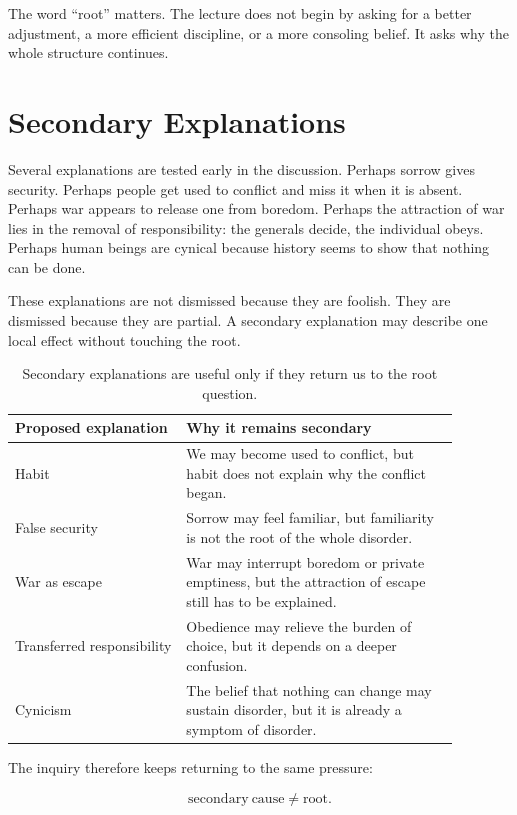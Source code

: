 The word ``root'' matters. The lecture does not begin by asking for a better adjustment, a more efficient discipline, or a more consoling belief. It asks why the whole structure continues.

\section{Secondary Explanations}

Several explanations are tested early in the discussion. Perhaps sorrow gives security. Perhaps people get used to conflict and miss it when it is absent. Perhaps war appears to release one from boredom. Perhaps the attraction of war lies in the removal of responsibility: the generals decide, the individual obeys. Perhaps human beings are cynical because history seems to show that nothing can be done.

These explanations are not dismissed because they are foolish. They are dismissed because they are partial. A secondary explanation may describe one local effect without touching the root.

\begin{table}
\centering
\begin{tabular}{p{0.34\linewidth}p{0.54\linewidth}}
\hline
\textbf{Proposed explanation} & \textbf{Why it remains secondary} \\
\hline
Habit & We may become used to conflict, but habit does not explain why the conflict began. \\
False security & Sorrow may feel familiar, but familiarity is not the root of the whole disorder. \\
War as escape & War may interrupt boredom or private emptiness, but the attraction of escape still has to be explained. \\
Transferred responsibility & Obedience may relieve the burden of choice, but it depends on a deeper confusion. \\
Cynicism & The belief that nothing can change may sustain disorder, but it is already a symptom of disorder. \\
\hline
\end{tabular}
\caption{Secondary explanations are useful only if they return us to the root question.}
\end{table}

The inquiry therefore keeps returning to the same pressure:

\begin{equation}
\mathrm{secondary\ cause}
\neq
\mathrm{root}.
\end{equation}

